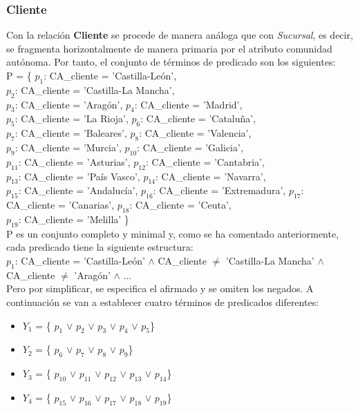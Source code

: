 \documentclass[paper=a4, fontsize=12pt]{article} %
\numberwithin{equation}{section} %
\numberwithin{figure}{section} %
\numberwithin{table}{section} %
\begin{document}
\subsubsection{Cliente}
Con la relación \textbf{Cliente} se procede de manera análoga que con \textit{Sucursal}, es decir, se fragmenta horizontalmente de manera primaria por el atributo comunidad autónoma. Por tanto, el conjunto de términos de predicado son los siguientes:\\

P = \{ $p_{1}$: CA\_cliente = 'Castilla-León', \\$p_{2}$: CA\_cliente = 'Castilla-La Mancha', \\$p_{3}$: CA\_cliente = 'Aragón', 
	$p_{4}$: CA\_cliente = 'Madrid', \\$p_{5}$: CA\_cliente = 'La Rioja', $p_{6}$: CA\_cliente = 'Cataluña', 
	\\$p_{7}$: CA\_cliente = 'Baleares', $p_{8}$: CA\_cliente = 'Valencia', \\$p_{9}$: CA\_cliente = 'Murcia', 
	$p_{10}$: CA\_cliente = 'Galicia', \\$p_{11}$: CA\_cliente = 'Asturias', $p_{12}$: CA\_cliente = 'Cantabria', 
	\\$p_{13}$: CA\_cliente = 'País Vasco', $p_{14}$: CA\_cliente = 'Navarra', \\$p_{15}$: CA\_cliente = 'Andalucía', 
	$p_{16}$: CA\_cliente = 'Extremadura', $p_{17}$: CA\_cliente = 'Canarias', $p_{18}$: CA\_cliente = 'Ceuta',
	\\$p_{19}$: CA\_cliente = 'Melilla' \}\\

P es un conjunto completo y minimal y, como se ha comentado anteriormente, cada predicado tiene la siguiente estructura: \\

$p_{1}$: CA\_cliente = 'Castilla-León' $\land$ CA\_cliente $\neq$ 'Castilla-La Mancha' $\land$ CA\_cliente $\neq$ 'Aragón' $\land$ ... \\

Pero por simplificar, se especifica el afirmado y se omiten los negados. A continuación se van a establecer cuatro términos de predicados diferentes:

\begin{itemize}
\item $Y_{1}$ = \{ $p_{1}$ $\vee$ $p_{2}$ $\vee$ $p_{3}$ $\vee$ $p_{4}$ $\vee$ $p_{5}$\}
\item $Y_{2}$ = \{ $p_{6}$ $\vee$ $p_{7}$ $\vee$ $p_{8}$ $\vee$ $p_{9}$\}
\item $Y_{3}$ = \{ $p_{10}$ $\vee$ $p_{11}$ $\vee$ $p_{12}$ $\vee$ $p_{13}$ $\vee$ $p_{14}$\}
\item $Y_{4}$ = \{ $p_{15}$ $\vee$ $p_{16}$ $\vee$ $p_{17}$ $\vee$ $p_{18}$ $\vee$ $p_{19}$\}
\end{itemize}
\end{document}

